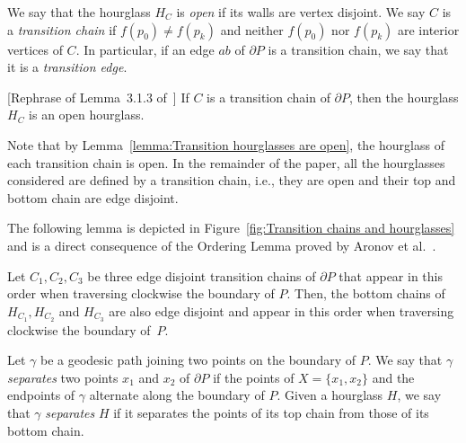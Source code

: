\documentclass[a4paper,UKenglish]{lipics}
\newcommand{\ff}[1]{\ensuremath{f(#1)}}
\begin{document}
We say that the hourglass $H_C$ is \emph{open} if its walls are vertex disjoint. 
We say $C$ is a \emph{transition chain} if $\ff{p_0} \neq \ff{p_k}$ and neither $\ff{p_0}$ nor $\ff{p_k}$ are interior vertices of $C$. In particular, if an edge $ab$ of $\partial P$ is a transition chain, we say that it is a \emph{transition edge}.

\begin{lemma}\label{lemma:Transition hourglasses are open}
[Rephrase of Lemma~3.1.3 of~\cite{aronov1993furthest}] 
If $C$ is a transition chain of $\partial P$, then the hourglass $H_C$ is an open hourglass.
\end{lemma}

Note that by Lemma~\ref{lemma:Transition hourglasses are open}, the hourglass of each transition chain is open.
In the remainder of the paper, all the hourglasses considered are defined by a transition chain, i.e., they are open and their top and bottom chain are edge disjoint.

The following lemma is depicted in Figure~\ref{fig:Transition chains and hourglasses} and is a direct consequence of the Ordering Lemma proved by Aronov et al.~\cite[Corollary 2.7.4]{aronov1993furthest}.
\begin{lemma}\label{lemma:Ordering Lemma}
Let $C_1, C_2, C_3$ be three edge disjoint transition chains of $\partial P$ that appear in this order when traversing clockwise the boundary of $P$. Then, the bottom chains of $H_{C_1}, H_{C_2}$ and $H_{C_3}$ are also edge disjoint and appear in this order when traversing clockwise the boundary of~$P$.
\end{lemma}

Let $\gamma$ be a  geodesic path joining two points on the boundary of $P$.
We say that $\gamma$ \emph{separates} two points $x_1$ and $x_2$ of $\partial P$ if the points of $X=\{x_1, x_2\}$ and the endpoints of $\gamma$ alternate along the boundary of $P$.
Given a hourglass $H$, we say that $\gamma$ \emph{separates} $H$ if it separates the points of its top chain from those of its  bottom chain.
\end{document}
